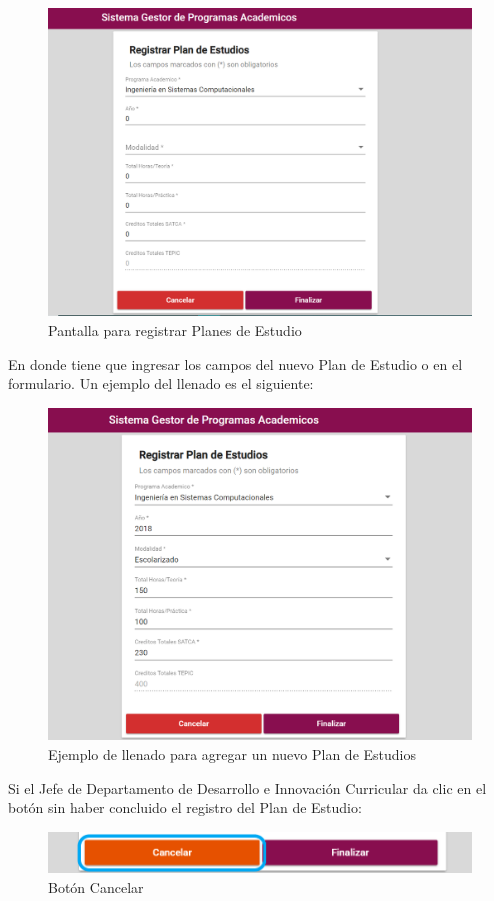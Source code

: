\begin{figure}[!hbtp]
	\centering
	\hypertarget{registrarPE}{\includegraphics[width=0.7\linewidth]{images/SP4-GPE/registrarPE}}
	\caption{Pantalla para registrar Planes de Estudio}
	\label{registrarPE}
\end{figure}
\newpage
En donde tiene que ingresar los campos del nuevo Plan de Estudio o en el formulario. Un ejemplo del llenado es el siguiente:

\begin{figure}[!hbtp]
	\centering
	\hypertarget{ejreg}{\includegraphics[width=0.7\linewidth]{images/SP4-GPE/registrarEjem}}
	\caption{Ejemplo de llenado para agregar un nuevo Plan de Estudios}
	\label{ejreg}
\end{figure}
Si el Jefe de Departamento de Desarrollo e Innovación Curricular da clic en el botón  sin haber concluido el registro del Plan de Estudio:

\begin{figure}[!hbtp]
	\centering
	\hypertarget{cancel2}{\includegraphics[width=0.7\linewidth]{images/SP4-GPE/cancelarPE}}
	\caption{Botón Cancelar}
	\label{cancel2}
\end{figure}
\newpage

